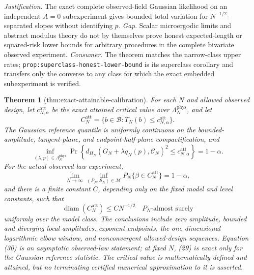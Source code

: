 \documentclass{article}
\newtheorem{theorem}{Theorem}
\begin{document}
\par\smallskip\noindent \textit{Justification.} The exact complete observed-field Gaussian likelihood on an independent \(A=0\) subexperiment gives bounded total variation for \(N^{-1/2}\)-separated slopes without identifying \(p\). \textit{Gap.} Scalar microergodic limits and abstract modulus theory do not by themselves prove honest expected-length or squared-risk lower bounds for arbitrary procedures in the complete bivariate observed experiment. \textit{Consumer.} The theorem matches the narrow-class upper rates; \texttt{prop:superclass-honest-lower-bound} is its superclass corollary and transfers only the converse to any class for which the exact embedded subexperiment is verified.

\begin{theorem}[thm:exact-attainable-calibration]\label{thm:exact-attainable-calibration}
For each \(N\) and allowed observed design, let \(c_{N,\alpha}^{\mathrm{att}}\) be the exact attained critical value over \(\Lambda_N^{\mathrm{phys}}\), and let
\[
C_N^{\mathrm{att}}=\{b\in\mathcal B:T_N(b)\le c_{N,\alpha}^{\mathrm{att}}\}.
\]
The Gaussian reference quantile is uniformly continuous on the bounded-amplitude, tangent-plane, and endpoint-half-plane compactification, and
\[
\inf_{(\lambda,p)\in\Lambda_N^{\mathrm{phys}}}
\Pr\!\left\{d_{H_N}(G_N+\lambda q_N(p),\mathcal C_N)^2
\le c_{N,\alpha}^{\mathrm{att}}\right\}=1-\alpha.                           \tag{29}
\]
For the actual observed-law experiment,
\[
\lim_{N\to\infty}\inf_{(P_N,\mathcal S_N)\in\mathcal M}
P_N\{\beta\in C_N^{\mathrm{att}}\}=1-\alpha,                               \tag{30}
\]
and there is a finite constant \(C\), depending only on the fixed model and level constants, such that
\[
\operatorname{diam}(C_N^{\mathrm{att}})\le C N^{-1/2}\quad P_N\text{-almost surely}                              \tag{31}
\]
uniformly over the model class.  The conclusions include zero amplitude, bounded and diverging local amplitudes, exponent endpoints, the one-dimensional logarithmic elbow window, and nonconvergent allowed-design sequences.  Equation (30) is an asymptotic observed-law statement; at fixed \(N\), (29) is exact only for the Gaussian reference statistic.  The critical value is mathematically defined and attained, but no terminating certified numerical approximation to it is asserted.
\end{theorem}
\end{document}

